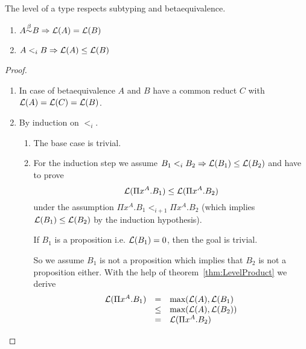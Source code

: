 \begin{theorem}
    \label{thm:LevelSubtypeEquivalence}
    The level of a type respects subtyping and betaequivalence.
    \begin{enumerate}
        \item $ A {\stackrel{\beta}{\sim}} B \Rightarrow {\cal L}(A) = {\cal L}(B)$

        \item $ A <_i B \Rightarrow {\cal L}(A) \le {\cal L}(B) $
    \end{enumerate}

    \begin{proof}
        \ \begin{enumerate}
            \item In case of betaequivalence $A$ and $B$ have a common reduct
                $C$ with ${\cal L}(A) = {\cal L}(C) = {\cal L}(B)$.

            \item By induction on $<_i$.
                \begin{enumerate}
                    \item The base case is trivial.

                    \item For the induction step we assume $B_1 <_i B_2 \Rightarrow
                        {\cal L}(B_1) \le {\cal L}(B_2)$ and have to prove
                        $$
                            {\cal L}(\Pi x^A.B_1) \le {\cal L}(\Pi x^A. B_2)
                        $$
                        under the assumption $ \Pi x^A. B_1 <_{i+1} \Pi x^A.
                        B_2$ (which implies ${\cal L}(B_1) \le {\cal L}(B_2)$ by the
                        induction hypothesis).

                        If $B_1$ is a proposition i.e. ${\cal L}(B_1) = 0$, then
                        the goal is trivial.

                        So we assume $B_1$ is not a
                        proposition which implies that $B_2$ is not a
                        proposition either. With the help of
                        theorem~\ref{thm:LevelProduct} we derive
                        $$
                        \begin{array}{lll}
                            {\cal L}(\Pi x^A. B_1)
                            & = & {\text{max}}({\cal L}(A), {\cal L}(B_1)
                            \\
                            & \le & {\text{max}}({\cal L}(A), {\cal L}(B_2))
                            \\
                            & = & {\cal L}(\Pi x^A. B_2)
                        \end{array}
                        $$
                \end{enumerate}
        \end{enumerate}
    \end{proof}
\end{theorem}




